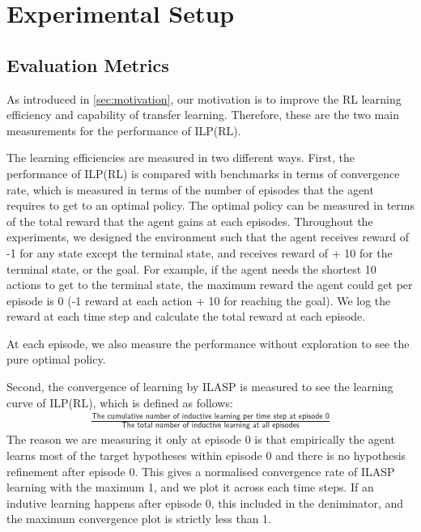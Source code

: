 \section{Experimental Setup}
\label{sec:experimental_setup}

\subsection{Evaluation Metrics}
\label{subsec:evaluation_metrics}

As introduced in \ref{sec:motivation}, our motivation is to improve the RL learning efficiency and capability of transfer learning.
Therefore, these are the two main measurements for the performance of ILP(RL).

The learning efficiencies are measured in two different ways. First, the performance of ILP(RL) is compared with benchmarks in terms of
convergence rate, which is measured in terms of the number of episodes that the agent requires to get to an optimal policy.
The optimal policy can be measured in terms of the total reward that the agent gains at each episodes. 
Throughout the experiments, we designed the environment such that the agent receives reward of -1 for any state except the terminal state, and receives reward of + 10 for the terminal state, or the goal.
For example, if the agent needs the shortest 10 actions to get to the terminal state, the maximum reward the agent could get per episode is 0 (-1 reward at each action + 10 for reaching the goal).
We log the reward at each time step and calculate the total reward at each episode. 

At each episode, we also measure the performance without exploration to see the pure optimal policy.

Second, the convergence of learning by ILASP is measured to see the learning curve of ILP(RL), which is defined as follows:
\begin{equation}
\begin{split}
\frac{\textsf{The cumulative number of inductive learning per time step at episode 0}}{\textsf{The total number of inductive learning at all episodes}}
\end{split}
\end{equation}
The reason we are measuring it only at episode 0 is that empirically the agent learns most of the target hypotheses within episode 0 and there is no hypothesis refinement after episode 0.
This gives a normalised convergence rate of ILASP learning with the maximum 1, and we plot it across each time steps. 
If an indutive learning happens after episode 0, this included in the deniminator, and the maximum convergence plot is strictly less than 1.

